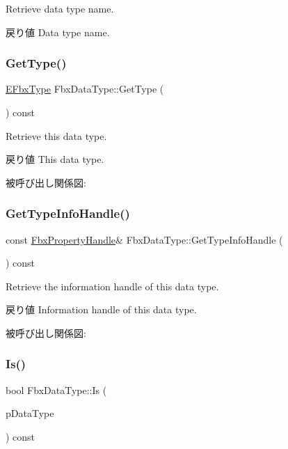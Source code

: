 Retrieve data type name. \begin{DoxyReturn}{戻り値}
Data type name. 
\end{DoxyReturn}
\mbox{\label{class_fbx_data_type_a0f3e5c89c7ea0f28aab4b6e6b823d069}} 
\subsubsection{\texorpdfstring{Get\+Type()}{GetType()}}
{\footnotesize\ttfamily \hyperlink{fbxpropertytypes_8h_a73913a5ddfb20e57c6f25e9e6784bd92}{E\+Fbx\+Type} Fbx\+Data\+Type\+::\+Get\+Type (\begin{DoxyParamCaption}{ }\end{DoxyParamCaption}) const}

Retrieve this data type. \begin{DoxyReturn}{戻り値}
This data type. 
\end{DoxyReturn}
被呼び出し関係図\+:
\mbox{\label{class_fbx_data_type_a425634131ed095605fd6480e997e7891}} 
\subsubsection{\texorpdfstring{Get\+Type\+Info\+Handle()}{GetTypeInfoHandle()}}
{\footnotesize\ttfamily const \hyperlink{class_fbx_property_handle}{Fbx\+Property\+Handle}\& Fbx\+Data\+Type\+::\+Get\+Type\+Info\+Handle (\begin{DoxyParamCaption}{ }\end{DoxyParamCaption}) const}

Retrieve the information handle of this data type. \begin{DoxyReturn}{戻り値}
Information handle of this data type. 
\end{DoxyReturn}
被呼び出し関係図\+:
\mbox{\label{class_fbx_data_type_ad0bd5c5341dd1dd93b302eb7a0475c81}} 
\subsubsection{\texorpdfstring{Is()}{Is()}}
{\footnotesize\ttfamily bool Fbx\+Data\+Type\+::\+Is (\begin{DoxyParamCaption}\item[{const \hyperlink{class_fbx_data_type}{Fbx\+Data\+Type} \&}]{p\+Data\+Type }\end{DoxyParamCaption}) const}

